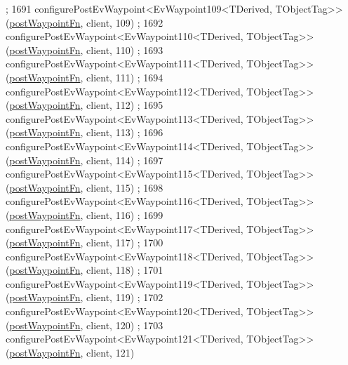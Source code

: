 \begin{DoxyCode}
      ;
1691     configurePostEvWaypoint<EvWaypoint109<TDerived, TObjectTag>>(\hyperlink{classcl__move__base__z_1_1WaypointEventDispatcher_a964a57fcce5d48ec60243230722d8dd7}{postWaypointFn}, client, 109)
      ;
1692     configurePostEvWaypoint<EvWaypoint110<TDerived, TObjectTag>>(\hyperlink{classcl__move__base__z_1_1WaypointEventDispatcher_a964a57fcce5d48ec60243230722d8dd7}{postWaypointFn}, client, 110)
      ;
1693     configurePostEvWaypoint<EvWaypoint111<TDerived, TObjectTag>>(\hyperlink{classcl__move__base__z_1_1WaypointEventDispatcher_a964a57fcce5d48ec60243230722d8dd7}{postWaypointFn}, client, 111)
      ;
1694     configurePostEvWaypoint<EvWaypoint112<TDerived, TObjectTag>>(\hyperlink{classcl__move__base__z_1_1WaypointEventDispatcher_a964a57fcce5d48ec60243230722d8dd7}{postWaypointFn}, client, 112)
      ;
1695     configurePostEvWaypoint<EvWaypoint113<TDerived, TObjectTag>>(\hyperlink{classcl__move__base__z_1_1WaypointEventDispatcher_a964a57fcce5d48ec60243230722d8dd7}{postWaypointFn}, client, 113)
      ;
1696     configurePostEvWaypoint<EvWaypoint114<TDerived, TObjectTag>>(\hyperlink{classcl__move__base__z_1_1WaypointEventDispatcher_a964a57fcce5d48ec60243230722d8dd7}{postWaypointFn}, client, 114)
      ;
1697     configurePostEvWaypoint<EvWaypoint115<TDerived, TObjectTag>>(\hyperlink{classcl__move__base__z_1_1WaypointEventDispatcher_a964a57fcce5d48ec60243230722d8dd7}{postWaypointFn}, client, 115)
      ;
1698     configurePostEvWaypoint<EvWaypoint116<TDerived, TObjectTag>>(\hyperlink{classcl__move__base__z_1_1WaypointEventDispatcher_a964a57fcce5d48ec60243230722d8dd7}{postWaypointFn}, client, 116)
      ;
1699     configurePostEvWaypoint<EvWaypoint117<TDerived, TObjectTag>>(\hyperlink{classcl__move__base__z_1_1WaypointEventDispatcher_a964a57fcce5d48ec60243230722d8dd7}{postWaypointFn}, client, 117)
      ;
1700     configurePostEvWaypoint<EvWaypoint118<TDerived, TObjectTag>>(\hyperlink{classcl__move__base__z_1_1WaypointEventDispatcher_a964a57fcce5d48ec60243230722d8dd7}{postWaypointFn}, client, 118)
      ;
1701     configurePostEvWaypoint<EvWaypoint119<TDerived, TObjectTag>>(\hyperlink{classcl__move__base__z_1_1WaypointEventDispatcher_a964a57fcce5d48ec60243230722d8dd7}{postWaypointFn}, client, 119)
      ;
1702     configurePostEvWaypoint<EvWaypoint120<TDerived, TObjectTag>>(\hyperlink{classcl__move__base__z_1_1WaypointEventDispatcher_a964a57fcce5d48ec60243230722d8dd7}{postWaypointFn}, client, 120)
      ;
1703     configurePostEvWaypoint<EvWaypoint121<TDerived, TObjectTag>>(\hyperlink{classcl__move__base__z_1_1WaypointEventDispatcher_a964a57fcce5d48ec60243230722d8dd7}{postWaypointFn}, client, 121)

\end{DoxyCode}

